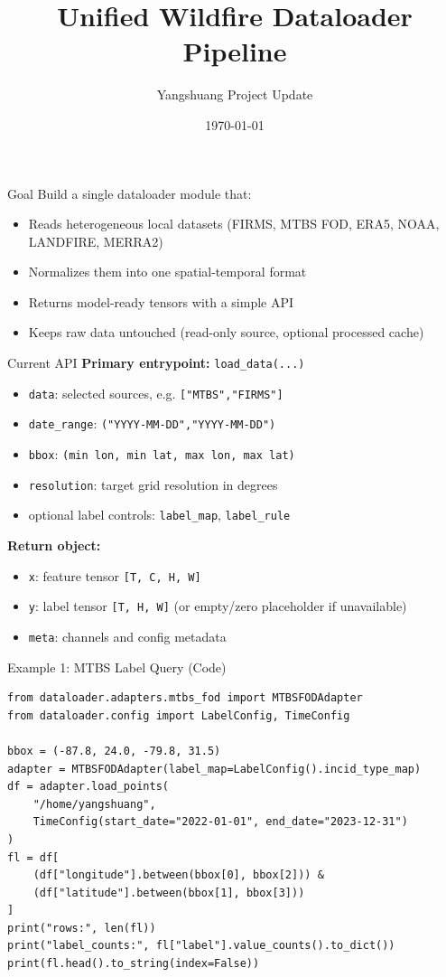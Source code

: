 \documentclass{beamer}
\title{Unified Wildfire Dataloader Pipeline}
\author{Yangshuang Project Update}
\date{\today}
\begin{document}
\begin{frame}
  \titlepage
\end{frame}

\begin{frame}{Goal}
Build a single dataloader module that:
\begin{itemize}
  \item Reads heterogeneous local datasets (FIRMS, MTBS FOD, ERA5, NOAA, LANDFIRE, MERRA2)
  \item Normalizes them into one spatial-temporal format
  \item Returns model-ready tensors with a simple API
  \item Keeps raw data untouched (read-only source, optional processed cache)
\end{itemize}
\end{frame}

\begin{frame}{Current API}
\textbf{Primary entrypoint:} \texttt{load\_data(...)}
\begin{itemize}
  \item \texttt{data}: selected sources, e.g. \texttt{["MTBS","FIRMS"]}
  \item \texttt{date\_range}: \texttt{("YYYY-MM-DD","YYYY-MM-DD")}
  \item \texttt{bbox}: \texttt{(min lon, min lat, max lon, max lat)}
  \item \texttt{resolution}: target grid resolution in degrees
  \item optional label controls: \texttt{label\_map}, \texttt{label\_rule}
\end{itemize}
\vspace{0.3em}
\textbf{Return object:}
\begin{itemize}
  \item \texttt{x}: feature tensor \texttt{[T, C, H, W]}
  \item \texttt{y}: label tensor \texttt{[T, H, W]} (or empty/zero placeholder if unavailable)
  \item \texttt{meta}: channels and config metadata
\end{itemize}
\end{frame}

\begin{frame}[fragile]{Example 1: MTBS Label Query (Code)}
\begin{lstlisting}[style=pycode]
from dataloader.adapters.mtbs_fod import MTBSFODAdapter
from dataloader.config import LabelConfig, TimeConfig

bbox = (-87.8, 24.0, -79.8, 31.5)
adapter = MTBSFODAdapter(label_map=LabelConfig().incid_type_map)
df = adapter.load_points(
    "/home/yangshuang",
    TimeConfig(start_date="2022-01-01", end_date="2023-12-31")
)
fl = df[
    (df["longitude"].between(bbox[0], bbox[2])) &
    (df["latitude"].between(bbox[1], bbox[3]))
]
print("rows:", len(fl))
print("label_counts:", fl["label"].value_counts().to_dict())
print(fl.head().to_string(index=False))
\end{lstlisting}
\end{frame}
\end{document}

